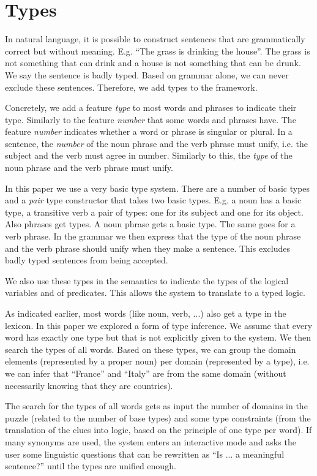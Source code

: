 \section{Types}
\label{sec:types}
In natural language, it is possible to construct sentences that are grammatically correct but without meaning. E.g. ``The grass is drinking the house''. The grass is not something that can drink and a house is not something that can be drunk. We say the sentence is badly typed. Based on grammar alone, we can never exclude these sentences. Therefore, we add types to the framework.

Concretely, we add a feature \textit{type} to most words and phrases to indicate their type. Similarly to the feature \textit{number} that some words and phrases have. The feature \textit{number} indicates whether a word or phrase is singular or plural. In a sentence, the \textit{number} of the noun phrase and the verb phrase must unify, i.e. the subject and the verb must agree in number. Similarly to this, the \textit{type} of the noun phrase and the verb phrase must unify.

In this paper we use a very basic type system. There are a number of basic types and a \textit{pair} type constructor that takes two basic types. E.g. a noun has a basic type, a transitive verb a pair of types: one for its subject and one for its object. Also phrases get types. A noun phrase gets a basic type. The same goes for a verb phrase. In the grammar we then express that the type of the noun phrase and the verb phrase should unify when they make a sentence. This excludes badly typed sentences from being accepted.

We also use these types in the semantics to indicate the types of the logical variables and of predicates. This allows the system to translate to a typed logic.

As indicated earlier, most words (like noun, verb, ...) also get a type in the lexicon. In this paper we explored a form of type inference. We assume that every word has exactly one type but that is not explicitly given to the system. We then search the types of all words. Based on these types, we can group the domain elements (represented by a proper noun) per domain (represented by a type), i.e. we can infer that ``France'' and ``Italy'' are from the same domain (without necessarily knowing that they are countries).

The search for the types of all words gets as input the number of domains in the puzzle (related to the number of base types) and some type constraints (from the translation of the clues into logic, based on the principle of one type per word). If many synonyms are used, the system enters an interactive mode and asks the user some linguistic questions that can be rewritten as ``Is ... a meaningful sentence?'' until the types are unified enough.


